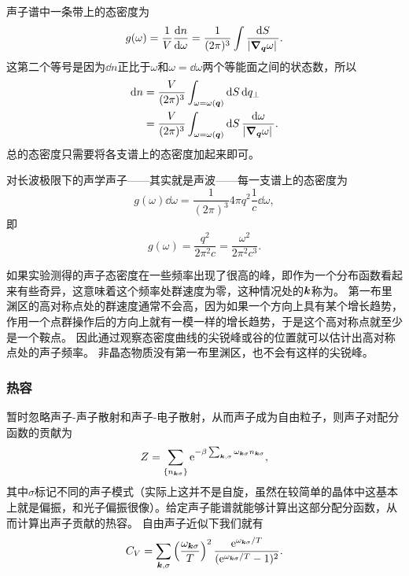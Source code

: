 声子谱中一条带上的态密度为
\begin{equation}
    g(\omega) = \frac{1}{V} \dv{n}{\omega} = \frac{1}{(2\pi)^3} \int \frac{\dd{S}}{\abs*{\grad_{\vb*{q}} \omega}}.
\end{equation}
这第二个等号是因为$\dd{n}$正比于$\omega$和$\omega = \dd{\omega}$两个等能面之间的状态数，所以
\[
    \begin{aligned}
        \dd{n} &= \frac{V}{(2\pi)^3} \int_{\omega=\omega(\vb*{q})} \dd{S} \dd{q_\bot} \\
        &= \frac{V}{(2\pi)^3} \int_{\omega=\omega(\vb*{q})} \dd{S} \frac{\dd{\omega}}{\abs*{\grad_{\vb*{q}} \omega}}.
    \end{aligned}
\]
总的态密度只需要将各支谱上的态密度加起来即可。

对长波极限下的声学声子——其实就是声波——每一支谱上的态密度为
\[
    g(\omega) \dd{\omega} = \frac{1}{(2\pi)^3} 4\pi q^2 \frac{1}{c} \dd{\omega},
\]
即
\begin{equation}
    g(\omega) = \frac{q^2}{2\pi^2 c} = \frac{\omega^2}{2\pi^2 c^3}.
    \label{eq:linear-phonon-state-density}
\end{equation}

如果实验测得的声子态密度在一些频率出现了很高的峰，即作为一个分布函数看起来有些奇异，这意味着这个频率处群速度为零，这种情况处的$\vb*{k}$称为。
第一布里渊区的高对称点处的群速度通常不会高，因为如果一个方向上具有某个增长趋势，作用一个点群操作后的方向上就有一模一样的增长趋势，于是这个高对称点就至少是一个鞍点。
因此通过观察态密度曲线的尖锐峰或谷的位置就可以估计出高对称点处的声子频率。
非晶态物质没有第一布里渊区，也不会有这样的尖锐峰。

\subsubsection{热容}\label{sec:lattice-special-heat}

暂时忽略声子-声子散射和声子-电子散射，从而声子成为自由粒子，则声子对配分函数的贡献为
\begin{equation}
    Z = \sum_{\{n_{\vb*{k} \sigma}\}} \mathrm{e}^{-\beta \sum_{\vb*{k}, \sigma} \omega_{\vb*{k} \sigma} n_{\vb*{k} \sigma}},
\end{equation}
其中$\sigma$标记不同的声子模式（实际上这并不是自旋，虽然在较简单的晶体中这基本上就是偏振，和光子偏振很像）。给定声子能谱就能够计算出这部分配分函数，从而计算出声子贡献的热容。
自由声子近似下我们就有
\begin{equation}
    C_V = \sum_{\vb*{k}, \sigma} \left(\frac{\omega_{\vb*{k}\sigma}}{T}\right)^2 \frac{\mathrm{e}^{\omega_{\vb*{k}\sigma} / T}}{(\mathrm{e}^{\omega_{\vb*{k}\sigma} / T} - 1)^2}.
    \label{eq:free-phonon-special-heat}
\end{equation}


